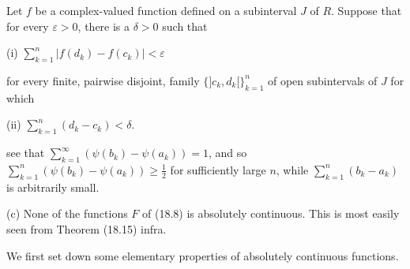 Let $f$ be a complex-valued function defined on a subinterval $J$ of $R$. Suppose that for every $\varepsilon > 0$, there is a $\delta > 0$ such that

(i) $\sum_{k=1}^{n} |f(d_k) - f(c_k)| < \varepsilon$

for every finite, pairwise disjoint, family $\{]c_k, d_k[\}_{k=1}^{n}$ of open subintervals of $J$ for which

(ii) $\sum_{k=1}^{n} (d_k - c_k) < \delta$.

see that $\sum_{k=1}^{\infty} (\psi(b_k) - \psi(a_k)) = 1$, and so $\sum_{k=1}^{n} (\psi(b_k) - \psi(a_k)) \geq \frac{1}{2}$ for sufficiently large $n$, while $\sum_{k=1}^{n} (b_k - a_k)$ is arbitrarily small.

(c) None of the functions $F$ of (18.8) is absolutely continuous. This is most easily seen from Theorem (18.15) infra.

We first set down some elementary properties of absolutely continuous functions.